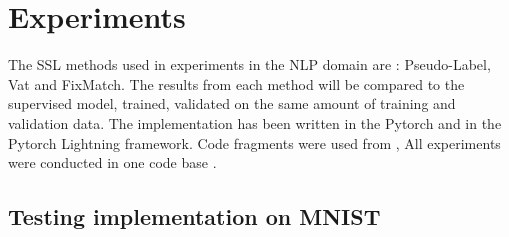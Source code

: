 \documentclass[12pt]{article}
\theoremstyle{definition}
\DeclareRobustCommand{\[}{\begin{equation}}
\DeclareRobustCommand{\]}{\end{equation}}
\begin{document}
           
\section{Experiments}
The SSL methods used in experiments in the NLP domain are : Pseudo-Label, Vat and FixMatch. The results from each method will be compared to the supervised model, trained, validated on the same amount of training and validation data.
The implementation has been written in the Pytorch and in the Pytorch Lightning framework. Code fragments were used from \cite{pytorch_fm}, \cite{pytorch_vat} All experiments were conducted in one code base \cite{composable_framework}.
\subsection{Testing implementation on MNIST}
\end{document}
